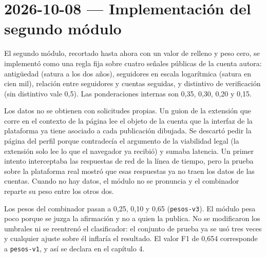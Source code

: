 \section{2026-10-08 — Implementación del segundo módulo}

El segundo módulo, recortado hasta ahora con un valor de relleno y peso cero, se implementó como una regla fija sobre cuatro señales públicas de la cuenta autora: antigüedad (satura a los dos años), seguidores en escala logarítmica (satura en cien mil), relación entre seguidores y cuentas seguidas, y distintivo de verificación (sin distintivo vale 0,5). Las ponderaciones internas son 0,35, 0,30, 0,20 y 0,15.

Los datos no se obtienen con solicitudes propias. Un guion de la extensión que corre en el contexto de la página lee el objeto de la cuenta que la interfaz de la plataforma ya tiene asociado a cada publicación dibujada. Se descartó pedir la página del perfil porque contradecía el argumento de la viabilidad legal (la extensión solo lee lo que el navegador ya recibió) y sumaba latencia. Un primer intento interceptaba las respuestas de red de la línea de tiempo, pero la prueba sobre la plataforma real mostró que esas respuestas ya no traen los datos de las cuentas. Cuando no hay datos, el módulo no se pronuncia y el combinador reparte su peso entre los otros dos.

Los pesos del combinador pasan a 0,25, 0,10 y 0,65 (\texttt{pesos-v3}). El módulo pesa poco porque se juzga la afirmación y no a quien la publica. No se modificaron los umbrales ni se reentrenó el clasificador: el conjunto de prueba ya se usó tres veces y cualquier ajuste sobre él inflaría el resultado. El valor F1 de 0,654 corresponde a \texttt{pesos-v1}, y así se declara en el capítulo 4.

\bigskip
